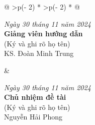 \documentclass[letterpaper]{article}
\begin{document}
\begin{longtable}[c]{@{}
>{\centering\arraybackslash}p{(\columnwidth - 2\tabcolsep) * }
>{\centering\arraybackslash}p{(\columnwidth - 2\tabcolsep) * }@{}}
\begin{minipage}[b]{\linewidth}\centering
\emph{Ngày 30 tháng 11 năm 2024}\\
\textbf{Giảng viên hướng dẫn}\\
(Ký và ghi rõ họ tên)\\
\vspace{3cm}
KS. Đoàn Minh Trung
\end{minipage} &
\begin{minipage}[b]{\linewidth}\centering
\emph{Ngày 30 tháng 11 năm 2024}\\
\textbf{Chủ nhiệm đề tài}\\
(Ký và ghi rõ họ tên)\\
\vspace{3cm}
Nguyễn Hải Phong
\end{minipage} \\
\end{longtable}
\end{document}
